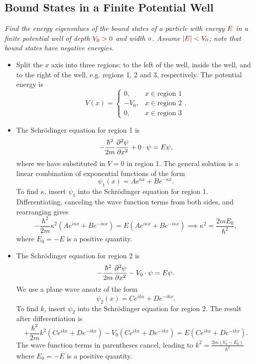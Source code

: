 \documentclass[11pt, a4paper]{article}
\newcommand{\dmath}[1]{\textcolor{Maroon}{#1}}  %
\newcommand{\Schro}{Schr\"{o}dinger\xspace}
\begin{document}
\subsection{Bound States in a Finite Potential Well}
\textit{Find the energy eigenvalues of the bound states of a particle with energy $ \dmath{E} $ in a finite potential well of depth $ \dmath{V_{0} > 0} $ and width $ \dmath{a} $. Assume $ \dmath{\abs{E} < V_{0}} $; note that bound states have negative energies.}
\begin{itemize}
	\item Split the $ x $ axis into three regions: to the left of the well, inside the well, and to the right of the well, e.g. regions 1, 2 and 3, respectively. The potential energy is
	\begin{equation*}
		V(x) =
		\begin{cases}
			0, & x \in \text{region 1}\\
			- V_{0}, & x \in \text{region 2}\\
			0, & x \in \text{region 3}
		\end{cases}.
	\end{equation*}
	
	\item The \Schro equation for region 1 is
	\begin{equation*}
		- \frac{\hbar^{2}}{2m}\pdv[2]{\psi}{x} + 0 \cdot \psi = E \psi,
	\end{equation*}
    where we have substituted in $ V = 0 $ in region 1. The general solution is a linear combination of exponential functions of the form
	\begin{equation*}
		\psi_{1}(x) = A e^{\kappa x} + B e^{- \kappa x}.
	\end{equation*}
	To find $ \kappa $, insert $ \psi_{1} $ into the \Schro equation for region 1. Differentiating, canceling the wave function terms from both sides, and rearranging gives
	\begin{equation*}
		-\frac{\hbar^{2}}{2m} \kappa^{2}\left(Ae^{i\kappa x} + B e^{- i\kappa x}\right) = E \left(A e^{i\kappa x} + B e^{- i\kappa x}\right) \implies \kappa^{2} = \frac{2mE_{0}}{\hbar^{2}},
	\end{equation*}
	where $ E_{0} = - E $ is a positive quantity.
	
	\item The \Schro equation for region 2 is
	\begin{equation*}
		- \frac{\hbar^{2}}{2m}\pdv[2]{\psi}{x} - V_{0} \cdot \psi = E \psi.
	\end{equation*}
	We use a plane wave ansatz of the form
	\begin{equation*}
		\psi_{2}(x) = Ce^{ikx} + De^{-ikx}.
	\end{equation*}
	To find $ k $, insert $ \psi_{2} $ into the \Schro equation for region 2. The result after differentiation is
	\begin{equation*}
		+\frac{\hbar^{2}}{2m} k^{2}\left(Ce^{ik x} + D e^{- ik x}\right) - V_{0}\left(C e^{ik x} + D e^{- ik x}\right)  = E \left(C e^{ik x} + D e^{- ik x}\right).
	\end{equation*}
	The wave function terms in parentheses cancel, leading to $ k^{2} = \frac{2m(V_{0}-E_{0})}{\hbar^{2}} $ where $ E_{0} = - E $ is a positive quantity.
	

\end{itemize}
\end{document}

